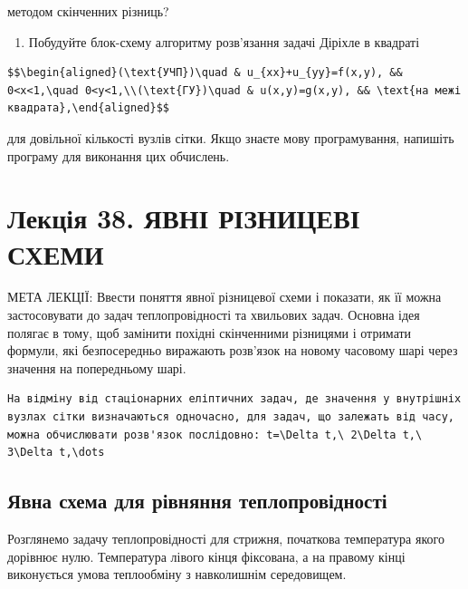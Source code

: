\documentclass[
  ukrainian,
]{article}
\providecommand{\tightlist}{%
  \setlength{\itemsep}{0pt}\setlength{\parskip}{0pt}}
\begin{document}
методом скінченних різниць?

\begin{enumerate}
\def\labelenumi{\arabic{enumi}.}
\setcounter{enumi}{5}
\tightlist
\item
  Побудуйте блок-схему алгоритму розв'язання задачі Діріхле в квадраті
\end{enumerate}

\begin{verbatim}
$$\begin{aligned}(\text{УЧП})\quad & u_{xx}+u_{yy}=f(x,y), && 0<x<1,\quad 0<y<1,\\(\text{ГУ})\quad & u(x,y)=g(x,y), && \text{на межі квадрата},\end{aligned}$$
\end{verbatim}

для довільної кількості вузлів сітки. Якщо знаєте мову програмування,
напишіть програму для виконання цих обчислень.

\section{Лекція 38. ЯВНІ РІЗНИЦЕВІ
СХЕМИ}\label{ux43bux435ux43aux446ux456ux44f-38.-ux44fux432ux43dux456-ux440ux456ux437ux43dux438ux446ux435ux432ux456-ux441ux445ux435ux43cux438}

МЕТА ЛЕКЦІЇ: Ввести поняття явної різницевої схеми і показати, як її
можна застосовувати до задач теплопровідності та хвильових задач.
Основна ідея полягає в тому, щоб замінити похідні скінченними різницями
і отримати формули, які безпосередньо виражають розв'язок на новому
часовому шарі через значення на попередньому шарі.

\begin{verbatim}
На відміну від стаціонарних еліптичних задач, де значення у внутрішніх вузлах сітки визначаються одночасно, для задач, що залежать від часу, можна обчислювати розв'язок послідовно: t=\Delta t,\ 2\Delta t,\ 3\Delta t,\dots
\end{verbatim}

\subsection{Явна схема для рівняння
теплопровідності}\label{ux44fux432ux43dux430-ux441ux445ux435ux43cux430-ux434ux43bux44f-ux440ux456ux432ux43dux44fux43dux43dux44f-ux442ux435ux43fux43bux43eux43fux440ux43eux432ux456ux434ux43dux43eux441ux442ux456}

Розглянемо задачу теплопровідності для стрижня, початкова температура
якого дорівнює нулю. Температура лівого кінця фіксована, а на правому
кінці виконується умова теплообміну з навколишнім середовищем.
\end{document}
